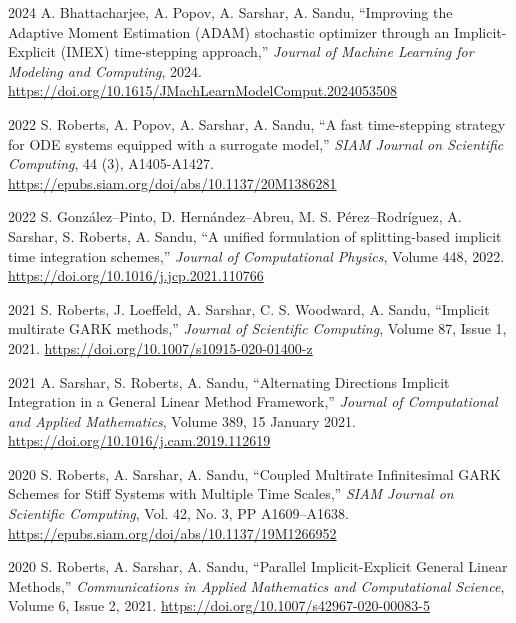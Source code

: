 \documentclass[11pt,letterpaper]{report}
\newcommand{\paperinfo}[5]{
    \tab{}
    #1, %
    \enquote{#2,} %
    \textit{#3}, %
    #4. %
    \href{#5}{#5} %
}
\begin{document}
    \begin{tablist}
    
    \item[2024] \paperinfo{A. Bhattacharjee, A. Popov, A. Sarshar, A. Sandu}
    {Improving the Adaptive Moment Estimation (ADAM) stochastic optimizer through an Implicit-Explicit (IMEX) time-stepping approach}
    {Journal of Machine Learning for Modeling and Computing}
    {2024}
    {https://doi.org/10.1615/JMachLearnModelComput.2024053508}

    \item[2022] \paperinfo{S. Roberts, A. Popov, A. Sarshar, A. Sandu}
        {A fast time-stepping strategy for ODE systems equipped with a surrogate model}
        {SIAM Journal on Scientific Computing}{44 (3), A1405-A1427}
        {https://epubs.siam.org/doi/abs/10.1137/20M1386281}

    \item[2022] \paperinfo{S. González--Pinto, D. Hernández--Abreu, M. S. Pérez--Rodríguez, A. Sarshar, S. Roberts, A. Sandu}
        {A unified formulation of splitting-based implicit time integration schemes}
        {Journal of Computational Physics}{Volume 448, 2022}
        {https://doi.org/10.1016/j.jcp.2021.110766}

    \item[2021] \paperinfo{S. Roberts, J. Loeffeld, A. Sarshar, C. S. Woodward, A. Sandu}
        {Implicit multirate GARK methods}
        {Journal of Scientific Computing}{Volume 87, Issue 1, 2021}
        {https://doi.org/10.1007/s10915-020-01400-z}

    \item[2021] \paperinfo{A. Sarshar, S. Roberts, A. Sandu}
        {Alternating Directions Implicit Integration in a General Linear Method Framework}
        {Journal of Computational and Applied Mathematics}{Volume 389, 15 January 2021}
        {https://doi.org/10.1016/j.cam.2019.112619}

    \item[2020] \paperinfo{S. Roberts, A. Sarshar, A. Sandu}
        {Coupled Multirate Infinitesimal GARK Schemes for Stiff Systems with Multiple Time Scales}
        {SIAM Journal on Scientific Computing}{Vol. 42, No. 3, PP A1609–A1638}
        {https://epubs.siam.org/doi/abs/10.1137/19M1266952}

    \item[2020] \paperinfo{S. Roberts, A. Sarshar, A. Sandu}
        {Parallel Implicit-Explicit General Linear Methods}
        {Communications in Applied Mathematics and Computational Science}{Volume 6, Issue 2, 2021}
        {https://doi.org/10.1007/s42967-020-00083-5}


\end{tablist}
\end{document}
